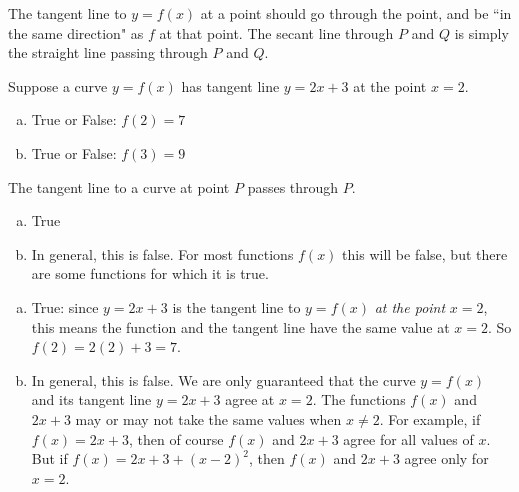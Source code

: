 \begin{solution}
\begin{center}
\end{center}
The tangent line to $y=f(x)$ at a point should go through
  the point, and be ``in the same direction" as $f$ at that point. The secant line through $P$ and $Q$ is simply the straight line passing through $P$ and $Q$.
\end{solution}

%
\begin{Mquestion}
Suppose a curve $y=f(x)$ has tangent line $y=2x+3$ at the point $x=2$.
\begin{enumerate}[(a)]
\item True or False: $f(2)=7$
\item True or False: $f(3)=9$
\end{enumerate}
\end{Mquestion}
\begin{hint}
The tangent line to a curve at point $P$ passes through $P$.
\end{hint}
\begin{answer}
\begin{enumerate}[(a)]
\item True
\item In general, this is false.
For most functions $f(x)$ this will be false, but there
                are some functions for which it is true.
\end{enumerate}
\end{answer}
\begin{solution}
\begin{enumerate}[(a)]
\item\label{test} True: since $y=2x+3$ is the tangent line to $y=f(x)$ \emph{at the point} $x=2$, this means the function and the tangent line have the same value at $x=2$. So $f(2)=2(2)+3=7$.
\item In general, this is false. We are only guaranteed
                that the curve $y=f(x)$ and its tangent line $y=2x+3$
                agree at $x=2$. The functions $f(x)$ and $2x+3$ may or
                may not take the same values when $x\ne 2$. For example,
                if $f(x)=2x+3$, then of course $f(x)$ and $2x+3$ agree
                for all values of $x$. But if $f(x) = 2x+3 +(x-2)^2$,
                then $f(x)$ and $2x+3$ agree only for $x=2$.
\end{enumerate}
\end{solution}


